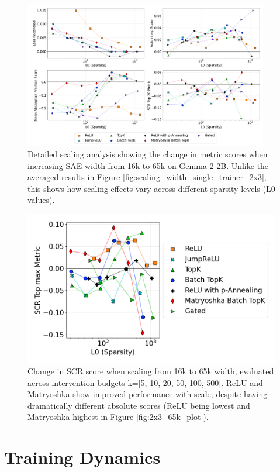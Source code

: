 \documentclass{article}
\theoremstyle{plain}
\theoremstyle{definition}
\theoremstyle{remark}
\begin{document}
\begin{figure}[htb]
\centering
\includegraphics[width=0.95\textwidth]
{images/plot_diff_sae_bench_gemma-2-2b_width_diff_series_layer_12.png}
\caption{Detailed scaling analysis showing the change in metric scores when increasing SAE width from 16k to 65k on Gemma-2-2B. Unlike the averaged results in Figure \ref{fig:scaling_width_single_trainer_2x3}, this shows how scaling effects vary across different sparsity levels (L0 values).}
\label{fig:2x3_width_diff_scalingplot}
\end{figure}
\begin{figure}[h!]
\centering
\includegraphics[width=0.7\columnwidth]{images/scr_intervention_budget_sweep_scaling_diff.png}
\caption{Change in SCR score when scaling from 16k to 65k width, evaluated across intervention budgets k=[5, 10, 20, 50, 100, 500]. ReLU and Matryoshka show improved performance with scale, despite having dramatically different absolute scores (ReLU being lowest and Matryoshka highest in Figure \ref{fig:2x3_65k_plot}).}
\label{fig:scr_intervention_budget_sweep_scaling_diff}
\end{figure}

\clearpage
\section{Training Dynamics}
\label{app:training_dynamics}
\end{document}
